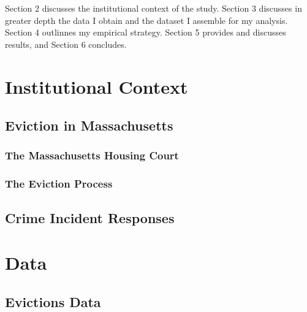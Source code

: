 \documentclass[12pt]{article}
\begin{document}
Section 2 discusses the institutional context of the study. Section 3 discusses in greater depth the data I obtain and the dataset I assemble for my analysis. Section 4 outlinnes my empirical strategy. Section 5 provides and discusses results, and Section 6 concludes.



\section{Institutional Context}
    \subsection{Eviction in Massachusetts}
        \subsubsection{The Massachusetts Housing Court}
        \subsubsection{The Eviction Process}
    \subsection{Crime Incident Responses}

\section{Data} \label{sec:data}

    \subsection{Evictions Data}
\end{document}
